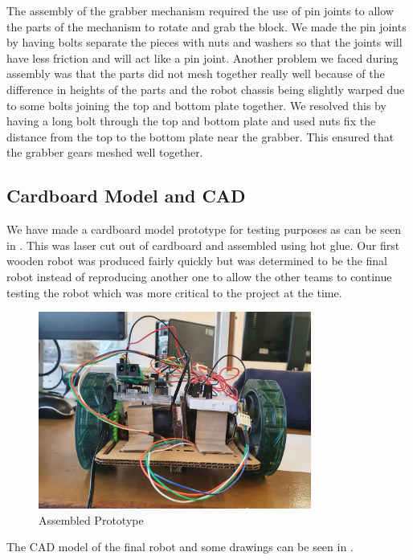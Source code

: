 \documentclass{article}
\begin{document}
\quad The assembly of the grabber mechanism required the use of pin joints to allow the parts of the mechanism to rotate and grab the block. We made the pin joints by having bolts separate the pieces with nuts and washers so that the joints will have less friction and will act like a pin joint. Another problem we faced during assembly was that the parts did not mesh together really well because of the difference in heights of the parts and the robot chassis being slightly warped due to some bolts joining the top and bottom plate together. We resolved this by having a long bolt through the top and bottom plate and used nuts fix the distance from the top to the bottom plate near the grabber. This ensured that the grabber gears meshed well together.

\subsection{Cardboard Model and CAD}
\quad We have made a cardboard model prototype for testing purposes as can be seen in . This was laser cut out of cardboard and assembled using hot glue. Our first wooden robot was produced fairly quickly but was determined to be the final robot instead of reproducing another one to allow the other teams to continue testing the robot which was more critical to the project at the time.

\begin{figure}[!h]
    \centering
    \includegraphics[width=0.8\textwidth]{assets/assembled_prototype.jpg}
    \caption{Assembled Prototype}
    \label{fig:assembled_prototype}
\end{figure}

The CAD model of the final robot and some drawings can be seen in .
\end{document}
